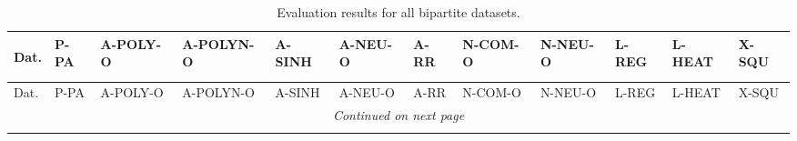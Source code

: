 
\begin{longtable}{ llllllllllll }

\caption[Evaluation results for all bipartite datasets]{Evaluation results for all bipartite datasets.}  \\


\label{results-all-bipartite}

Dat.                   & P-PA  & A-POLY-O & A-POLYN-O & A-SINH & A-NEU-O & A-RR  & N-COM-O & N-NEU-O & L-REG & L-HEAT & X-SQU \\ 
\hline

\endfirsthead


\hline
Dat.                   & P-PA  & A-POLY-O & A-POLYN-O & A-SINH & A-NEU-O & A-RR  & N-COM-O & N-NEU-O & L-REG & L-HEAT & X-SQU \\ 
\hline

\endhead

\hline
\multicolumn{12}{c}{\textit{Continued on next page}} \\* 
\hline

\endfoot

\hline \hline
\endlastfoot


\end{longtable}
